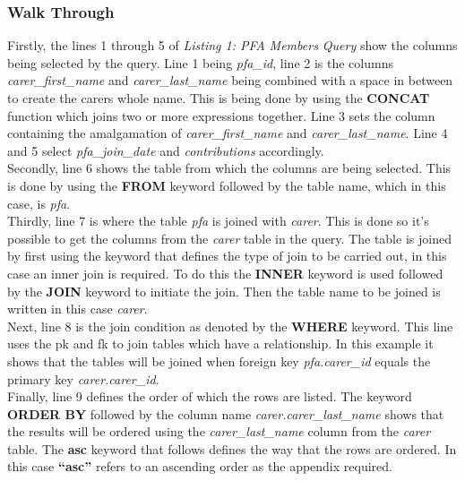 \documentclass{article}
\begin{document}
\subsubsection{Walk Through} Firstly, the lines 1 through 5 of \textit{Listing 1: PFA Members Query} show the columns being selected by the query. Line 1 being \textit{pfa\_id}, line 2 is the columns \textit{carer\_first\_name} and \textit{carer\_last\_name} being combined with a space in between to create the carers whole name. This is being done by using the \textbf{CONCAT} \gls{function} which joins two or more expressions together. Line 3 sets the column containing the amalgamation of \textit{carer\_first\_name} and \textit{carer\_last\_name}. Line 4 and 5 select \textit{pfa\_join\_date} and \textit{contributions} accordingly.
\\\newline
Secondly, line 6 shows the table from which the columns are being selected. This is done by using the \textbf{FROM} keyword followed by the table name, which in this case, is \textit{pfa}.
\\\newline
Thirdly, line 7 is where the table \textit{pfa} is joined with \textit{carer}. This is done so it's possible to get the columns from the \textit{carer} table in the query. The table is joined by first using the keyword that defines the type of join to be carried out, in this case an inner join is required. To do this the \textbf{INNER} keyword is used followed by the \textbf{JOIN} keyword to initiate the join. Then the table name to be joined is written in this case \textit{carer}.
\\\newline
Next, line 8 is the join condition as denoted by the \textbf{WHERE} keyword. This line uses the \acrfull{pk} and \acrfull{fk} to join tables which have a relationship. In this example it shows that the tables will be joined when foreign key \textit{pfa.carer\_id} equals the primary key \textit{carer.carer\_id}.
\\\newline
Finally, line 9 defines the order of which the rows are listed. The keyword \textbf{ORDER BY} followed by the column name \textit{carer.carer\_last\_name} shows that the results will be ordered using the  \textit{carer\_last\_name} column from the \textit{carer} table. The \textbf{\acrshort{asc}} keyword that follows defines the way that the rows are ordered. In this case \textbf{``\acrshort{asc}''} refers to an ascending order as the appendix required.
\end{document}
